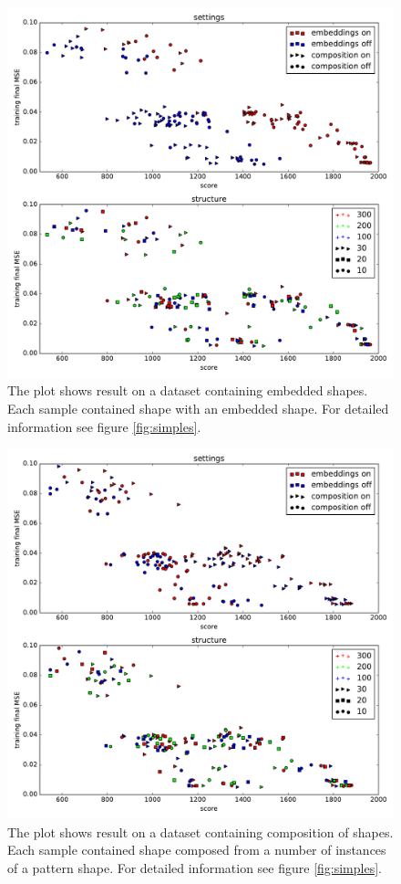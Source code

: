 \begin{figure}
\centering
\includegraphics[width=\linewidth]{ext/figure_embed_cmb.pdf}
\caption{The plot shows result on a dataset containing embedded shapes. Each sample  contained shape with an embedded shape. For detailed information see figure \ref{fig:simples}.}
\label{fig:embed}
\end{figure}

\begin{figure}
\centering
\includegraphics[width=\linewidth]{ext/figure_comp_cmb.pdf}
\caption{The plot shows result on a dataset containing composition of shapes. Each sample  contained shape composed from a number of instances of a pattern shape. For detailed information see figure \ref{fig:simples}.}
\label{fig:comp}
\end{figure}

